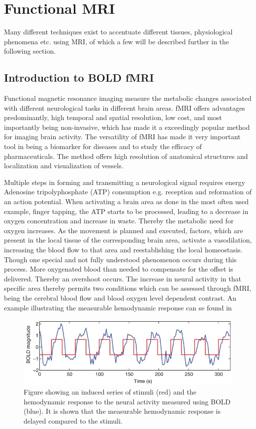 \section{Functional MRI}

Many different techniques exist to accentuate different tissues, physiological phenomena etc. using MRI, of which a few will be described further in the following section. 

\subsection{Introduction to BOLD fMRI}
Functional magnetic resonance imaging measure the metabolic changes associated with different neurological tasks in different brain areas. fMRI offers advantages predominantly, high temporal and spatial resolution, low cost, and most importantly being non-invasive, which has made it a exceedingly popular method for imaging brain activity. The versatility of fMRI has made it very important tool in being a biomarker for diseases and to study the efficacy of pharmaceuticals. The method offers high resolution of anatomical structures and localization and visualization of vessels. \cite{Glover2011} 

Multiple steps in forming and transmitting a neurological signal requires energy Adenosine tripolyphosphate (ATP) consumption e.g. reception and reformation of an action potential. When activating a brain area as done in the most often used example, finger tapping, the ATP starts to be processed, leading to a decrease in oxygen concentration and increase in waste. Thereby the metabolic need for oxygen increases. As the movement is planned and executed, factors, which are present in the local tissue of the corresponding brain area, activate a vasodilation, increasing the blood flow to that area and reestablishing the local homeostasis. Though one special and not fully understood phenomenon occurs during this process. More oxygenated blood than needed to compensate for the offset is delivered. Thereby an overshoot occurs. The increase in neural activity in that specific area thereby permits two conditions which can be assessed through fMRI, being the cerebral blood flow and blood oxygen level dependent contrast. An example illustrating the measurable hemodynamic response can se found in \cite{Glover2011,Poldrack2011}

\begin{figure}[H]                 
	\includegraphics[width=.69\textwidth]{figures/aBackground/stimuli_vs_response}  
	\caption{Figure showing an induced series of stimuli (red) and the hemodynamic response to the neural activity measured using BOLD (blue). It is shown that the measurable hemodynamic response is delayed compared to the stimuli. \cite{Poldrack2011}}
	\label{fig:back:stim} 
\end{figure}


